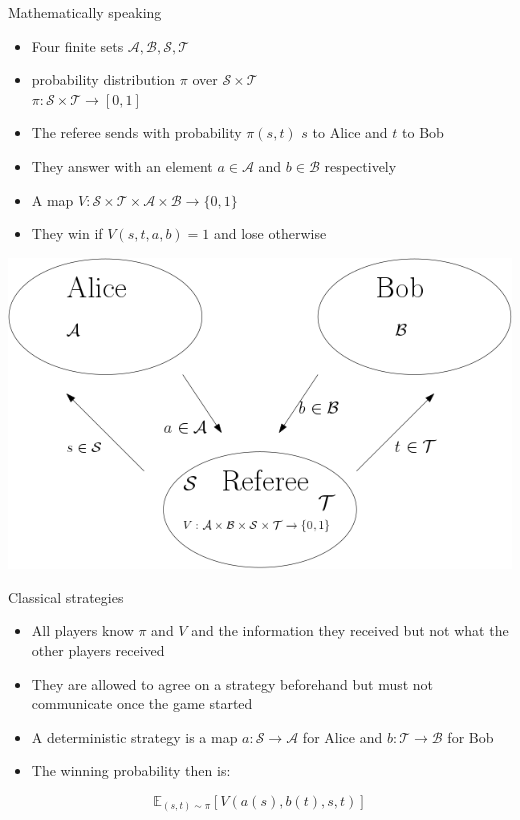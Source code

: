 \begin{frame}{Mathematically speaking}
\begin{itemize}
    \item Four finite sets $\mathcal{A}, \mathcal{B}, \mathcal{S}, \mathcal{T}$ \pause
    \item probability distribution $\pi$ over $\mathcal{S} \times \mathcal{T}$ \\ $\pi : \mathcal{S} \times \mathcal{T} \rightarrow [0,1]$ \pause
    \item The referee sends with probability $\pi (s,t)$ $s$ to Alice and $t$ to Bob \pause
    \item They answer with an element $a \in \mathcal{A}$ and $b \in \mathcal{B}$ respectively \pause
    \item A map $V : \mathcal{S} \times \mathcal{T} \times \mathcal{A} \times \mathcal{B} \rightarrow \{ 0, 1 \}$ \pause
    \item They win if $V(s,t,a,b)=1$ and lose otherwise
\end{itemize}
\begin{center}

\includegraphics[scale=0.3]{Untitled.png}

\end{center}
\end{frame}


\begin{frame}{Classical strategies}
    \begin{itemize}
        \item All players know $\pi$ and $V$ and the information they received but not what the other players received \pause
        \item They are allowed to agree on a strategy beforehand but must not communicate once the game started \pause
        \item A deterministic strategy is a map $a : \mathcal{S} \rightarrow \mathcal{A}$ for Alice and $b : \mathcal{T} \rightarrow \mathcal{B}$ for Bob \pause
        \item The winning probability then is:
    \end{itemize}
    \begin{equation*}
        \mathbb{E}_{(s,t) \sim \pi} \left[ V(a(s),b(t),s,t) \right]
\end{equation*}
\end{frame}

